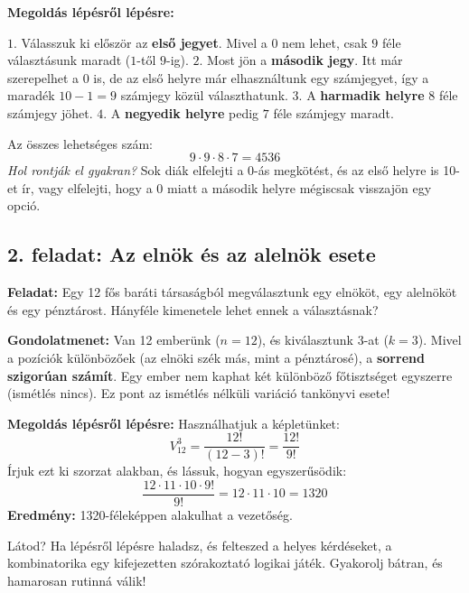 \documentclass[11pt,a4paper]{article}
\begin{document}
\noindent\textbf{Megoldás lépésről lépésre:}
\begin{enumerate}
    $1.$ Válasszuk ki először az \textbf{első jegyet}. Mivel a 0 nem lehet, csak $9$ féle választásunk maradt ($1$-től $9$-ig).
    $2.$ Most jön a \textbf{második jegy}. Itt már szerepelhet a 0 is, de az első helyre már elhasználtunk egy számjegyet, így a maradék $10 - 1 = 9$ számjegy közül választhatunk.
    $3.$ A \textbf{harmadik helyre} $8$ féle számjegy jöhet.
    $4.$ A \textbf{negyedik helyre} pedig $7$ féle számjegy maradt.
\end{enumerate}
Az összes lehetséges szám: 
\[ 9 \cdot 9 \cdot 8 \cdot 7 = 4536 \]
\emph{Hol rontják el gyakran?} Sok diák elfelejti a 0-ás megkötést, és az első helyre is 10-et ír, vagy elfelejti, hogy a 0 miatt a második helyre mégiscsak visszajön egy opció.

\subsection*{2. feladat: Az elnök és az alelnök esete}
\textbf{Feladat:} Egy 12 fős baráti társaságból megválasztunk egy elnököt, egy alelnököt és egy pénztárost. Hányféle kimenetele lehet ennek a választásnak?

\noindent\textbf{Gondolatmenet:} 
Van 12 emberünk ($n=12$), és kiválasztunk 3-at ($k=3$). Mivel a pozíciók különbözőek (az elnöki szék más, mint a pénztárosé), a \textbf{sorrend szigorúan számít}. Egy ember nem kaphat két különböző főtisztséget egyszerre (ismétlés nincs). Ez pont az ismétlés nélküli variáció tankönyvi esete!

\noindent\textbf{Megoldás lépésről lépésre:}
Használhatjuk a képletünket:
\[ V_{12}^3 = \frac{12!}{(12-3)!} = \frac{12!}{9!} \]
Írjuk ezt ki szorzat alakban, és lássuk, hogyan egyszerűsödik:
\[ \frac{12 \cdot 11 \cdot 10 \cdot 9!}{9!} = 12 \cdot 11 \cdot 10 = 1320 \]
\textbf{Eredmény:} 1320-féleképpen alakulhat a vezetőség.

\begin{tcolorbox}[colback=mysecondary,colframe=myprimary,arc=4pt,title=\textbf{Záró gondolat}]
Látod? Ha lépésről lépésre haladsz, és felteszed a helyes kérdéseket, a kombinatorika egy kifejezetten szórakoztató logikai játék. Gyakorolj bátran, és hamarosan rutinná válik!
\end{tcolorbox}
\end{document}
